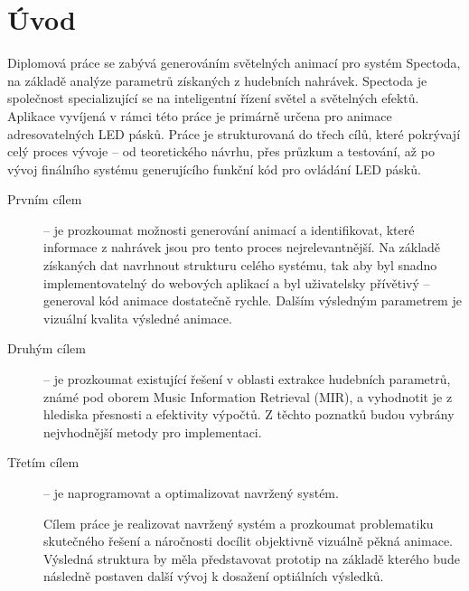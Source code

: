 \chapter*{Úvod}
{}

Diplomová práce se zabývá generováním světelných animací pro systém Spectoda, na základě analýze parametrů získaných z hudebních nahrávek. Spectoda je společnost specializující se na inteligentní řízení světel a světelných efektů. Aplikace vyvíjená v rámci této práce je primárně určena pro animace adresovatelných LED pásků. Práce je strukturovaná do třech cílů, které pokrývají celý proces vývoje -- od teoretického návrhu, přes průzkum a testování, až po vývoj finálního systému generujícího funkční kód pro ovládání LED pásků.

\begin{description}
    \item[Prvním cílem] -- je prozkoumat možnosti generování animací a identifikovat, které informace z nahrávek jsou pro tento proces nejrelevantnější. Na základě získaných dat navrhnout strukturu celého systému, tak aby byl snadno implementovatelný do webových aplikací a byl uživatelsky přívětivý -- generoval kód animace dostatečně rychle. Dalším výsledným parametrem je vizuální kvalita výsledné animace. 


    \item[Druhým cílem] -- je prozkoumat existující řešení v oblasti extrakce hudebních parametrů, známé pod oborem Music Information Retrieval (MIR), a vyhodnotit je z hlediska přesnosti a efektivity výpočtů. Z těchto poznatků budou vybrány nejvhodnější metody pro implementaci.
    \item[Třetím cílem] -- je naprogramovat a optimalizovat navržený systém. 
    
    Cílem práce je realizovat navržený systém a prozkoumat problematiku skutečného řešení a náročnosti docílit objektivně vizuálně pěkná animace. Výsledná struktura by měla představovat prototip na základě kterého bude následně postaven další vývoj k dosažení optiálních výsledků. 
    
\end{description}




